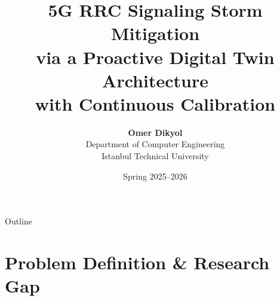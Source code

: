 \documentclass[aspectratio=169,t]{beamer}
\title[5G RRC Signaling Storm]{%
  5G RRC Signaling Storm Mitigation\\
  via a Proactive Digital Twin Architecture\\
  with Continuous Calibration}
\author[Omer Dikyol]{%
  \textbf{Omer Dikyol}\\[4pt]
  {\small Department of Computer Engineering}\\
  {\small Istanbul Technical University}}
\institute[ITU]{BLG 632E -- Next Generation Wireless Networks}
\date{Spring 2025--2026}
\begin{document}

{
\begin{frame}[noframenumbering]
  \titlepage
\end{frame}
}

\begin{frame}{Outline}
  \tableofcontents[hideallsubsections]
\end{frame}

\section{Problem Definition \& Research Gap}
\end{document}
